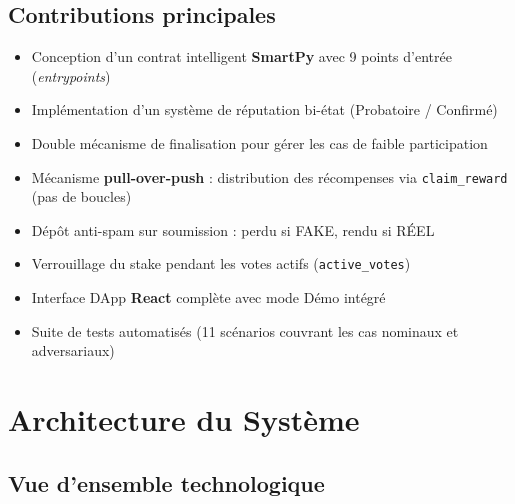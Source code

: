 \documentclass[12pt,a4paper]{article}
\newcommand{\smartpy}{\textcolor{accent}{\textbf{SmartPy}}}
\newcommand{\reactjs}{\textcolor{success}{\textbf{React}}}
\begin{document}
\subsection{Contributions principales}

\begin{itemize}
  \item Conception d'un contrat intelligent \smartpy{} avec 9 points d'entrée (\emph{entrypoints})
  \item Implémentation d'un système de réputation bi-état (Probatoire / Confirmé)
  \item Double mécanisme de finalisation pour gérer les cas de faible participation
  \item Mécanisme \textbf{pull-over-push} : distribution des récompenses via \texttt{claim\_reward} (pas de boucles)
  \item Dépôt anti-spam sur soumission : perdu si FAKE, rendu si RÉEL
  \item Verrouillage du stake pendant les votes actifs (\texttt{active\_votes})
  \item Interface DApp \reactjs{} complète avec mode Démo intégré
  \item Suite de tests automatisés (11 scénarios couvrant les cas nominaux et adversariaux)
\end{itemize}

\section{Architecture du Système}

\subsection{Vue d'ensemble technologique}
\end{document}
